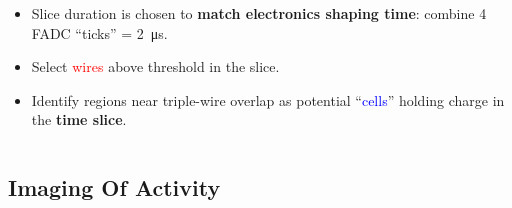 \begin{frame}[fragile]
\begin{columns}
\begin{column}{0.65\textwidth}
      \begin{itemize} \scriptsize
      \item Slice duration is chosen to \textbf{match
          electronics shaping time}: combine 4 FADC ``ticks'' =
        \SI{2}{\micro\second}.
      \item Select \textcolor{red}{wires} above threshold in the slice.
      \item Identify regions near triple-wire overlap as potential ``\textcolor{blue}{cells}'' holding charge in the \textbf{time slice}.
      \end{itemize}
    \end{column}
  \end{columns}

\end{frame}

\subsection{Imaging Of Activity}

